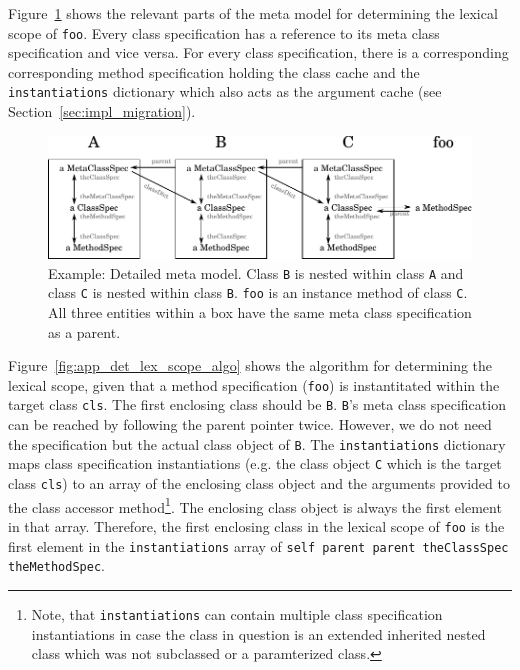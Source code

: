 Figure~\ref{fig:app_lex_scope} shows the relevant parts of the meta model for determining the lexical scope of \texttt{foo}. Every class specification has a reference to its meta class specification and vice versa. For every class specification, there is a corresponding corresponding method specification holding the class cache and the \texttt{instantiations} dictionary which also acts as the argument cache (see Section~\ref{sec:impl_migration}).

\begin{figure}[!htp]
\includegraphics[width=\textwidth]{lexical_scope_app_ex.pdf}
\caption[Example: Detailed meta model]{Example: Detailed meta model. Class \texttt{B} is nested within class \texttt{A} and class \texttt{C} is nested within class \texttt{B}. \texttt{foo} is an instance method of class \texttt{C}. All three entities within a box have the same meta class specification as a parent.}
\label{fig:app_lex_scope}
\end{figure}

Figure~\ref{fig:app_det_lex_scope_algo} shows the algorithm for determining the lexical scope, given that a method specification (\texttt{foo}) is instantitated within the target class \texttt{cls}. The first enclosing class should be \texttt{B}. \texttt{B}'s meta class specification can be reached by following the parent pointer twice. However, we do not need the specification but the actual class object of \texttt{B}. The \texttt{instantiations} dictionary maps class specification instantiations (e.g. the class object \texttt{C} which is the target class \texttt{cls}) to an array of the enclosing class object and the arguments provided to the class accessor method\footnote{Note, that \texttt{instantiations} can contain multiple class specification instantiations in case the class in question is an extended inherited nested class which was not subclassed or a paramterized class.}. The enclosing class object is always the first element in that array. Therefore, the first enclosing class in the lexical scope of \texttt{foo} is the first element in the \texttt{instantiations} array of \texttt{self parent parent theClassSpec theMethodSpec}.

